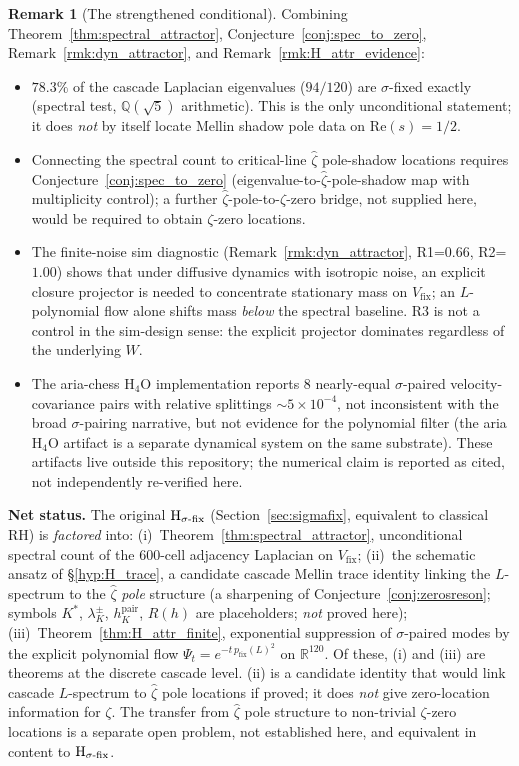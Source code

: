 \documentclass[11pt, a4paper]{amsart}
\theoremstyle{definition}
\newtheorem{remark}[theorem]{Remark}
\newcommand{\R}{\mathbb{R}}
\newcommand{\Q}{\mathbb{Q}}
\begin{document}
\begin{remark}[The strengthened conditional]\label{rmk:strengthened}
Combining Theorem~\ref{thm:spectral_attractor},
Conjecture~\ref{conj:spec_to_zero},
Remark~\ref{rmk:dyn_attractor}, and
Remark~\ref{rmk:H_attr_evidence}:
\begin{itemize}
\item $78.3\%$ of the cascade Laplacian eigenvalues
($94/120$) are $\sigma$-fixed exactly
(spectral test, $\Q(\sqrt 5)$ arithmetic).  This is the only
unconditional statement; it does \emph{not} by itself locate
Mellin shadow pole data on $\mathrm{Re}(s)=1/2$.
\item Connecting the spectral count to critical-line $\widehat\zeta$
pole-shadow locations requires Conjecture~\ref{conj:spec_to_zero}
(eigenvalue-to-$\widehat\zeta$-pole-shadow map with multiplicity
control); a further $\widehat\zeta$-pole-to-$\zeta$-zero bridge,
not supplied here, would be required to obtain $\zeta$-zero
locations.
\item The finite-noise sim diagnostic
(Remark~\ref{rmk:dyn_attractor}, R1=$0.66$, R2=$1.00$) shows
that under diffusive dynamics with isotropic noise, an explicit
closure projector is needed to concentrate stationary mass on
$V_{\mathrm{fix}}$; an $L$-polynomial flow alone shifts mass
\emph{below} the spectral baseline.  R3 is not a control in the
sim-design sense: the explicit projector dominates regardless of
the underlying $W$.
\item The aria-chess H$_4$O implementation
\cite{ariaH4Olaw} reports $8$ nearly-equal $\sigma$-paired
velocity-covariance pairs with relative splittings
$\sim 5 \times 10^{-4}$, not inconsistent with the broad
$\sigma$-pairing narrative, but not evidence for the polynomial
filter (the aria H$_4$O artifact is a separate dynamical system on
the same substrate).  These artifacts live outside this repository; the
numerical claim is reported as cited, not independently re-verified
here.
\end{itemize}
\textbf{Net status.}  The original $\textup{H}_{\sigma\text{-fix}}$
(Section~\ref{sec:sigmafix}, equivalent to classical RH) is
\emph{factored} into:
(i)~Theorem~\ref{thm:spectral_attractor}, unconditional spectral
count of the 600-cell adjacency Laplacian on $V_{\mathrm{fix}}$;
(ii)~the schematic ansatz of \S\ref{hyp:H_trace}, a candidate
cascade Mellin trace identity linking the $L$-spectrum to the
$\widehat\zeta$ \emph{pole} structure (a sharpening of
Conjecture~\ref{conj:zerosreson}; symbols $K^*$,
$\lambda^\pm_K$, $h^{\mathrm{pair}}_K$, $R(h)$ are placeholders;
\emph{not} proved here);
(iii)~Theorem~\ref{thm:H_attr_finite}, exponential suppression of
$\sigma$-paired modes by the explicit polynomial flow
$\Psi_t = e^{-t\,p_{\mathrm{fix}}(L)^2}$ on $\R^{120}$.
Of these, (i) and (iii) are theorems at the discrete cascade level.
(ii) is a candidate identity that would link cascade
$L$-spectrum to $\widehat\zeta$ pole locations if proved; it does
\emph{not} give zero-location information for $\zeta$.  The transfer
from $\widehat\zeta$ pole structure to non-trivial $\zeta$-zero
locations is a separate open problem, not established here, and
equivalent in content to $\textup{H}_{\sigma\text{-fix}}$.
\end{remark}
\end{document}
